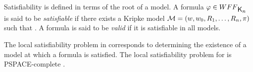Satisfiability is defined in terms of the root of a model. A formula $\varphi \in \wff$ is said to be \emph{satisfiable} if there exists a Kripke model $\mathcal{M} = (w, w_0, R_1, \ldots, R_n, \pi)$ such that . A formula is said to be \emph{valid} if it is satisfiable in all models.

The local satisfiability problem in  corresponds to determining the existence of a model at which a formula is satisfied. The local satisfiability problem for  is PSPACE-complete \cite{Spaan:coml}.
